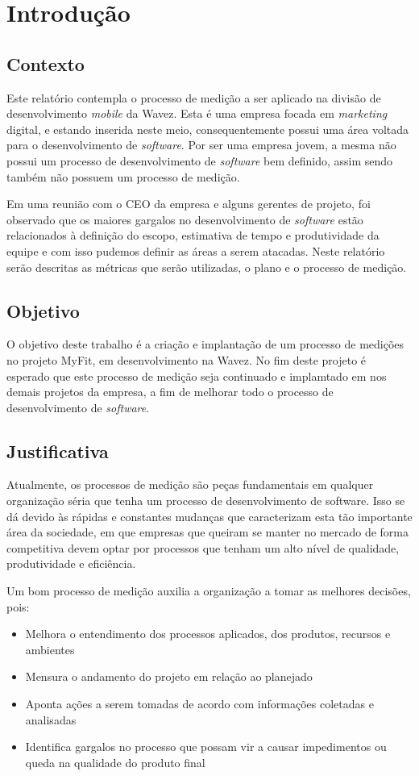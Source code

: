 \chapter{Introdução}
\section{Contexto}
Este relatório contempla o processo de medição a ser aplicado na divisão de desenvolvimento \textit{mobile} da Wavez. Esta é uma empresa focada em \textit{marketing} digital, e estando inserida neste meio, consequentemente possui uma área voltada para o desenvolvimento de \textit{software}. Por ser uma empresa jovem, a mesma não possui um processo de desenvolvimento de \textit{software} bem definido, assim sendo também não possuem um processo de medição.

Em uma reunião com o CEO da empresa e alguns gerentes de projeto, foi observado que os maiores gargalos no desenvolvimento de \textit{software} estão relacionados à definição do escopo, estimativa de tempo e produtividade da equipe e com isso pudemos definir as áreas a serem atacadas. Neste relatório serão descritas as métricas que serão utilizadas, o plano e o processo de medição.
\section{Objetivo}
O objetivo deste trabalho é a criação e implantação de um processo de medições no projeto MyFit, em desenvolvimento na Wavez. No fim deste projeto é esperado que este processo de medição seja continuado e implamtado em nos demais projetos da empresa, a fim de melhorar todo o processo de desenvolvimento de \textit{software}.
\section{Justificativa}
Atualmente, os processos de medição são peças fundamentais em qualquer organização séria que tenha um processo de desenvolvimento de software. Isso se dá devido às rápidas e constantes mudanças que caracterizam esta tão importante área da sociedade, em que empresas que queiram se manter no mercado de forma competitiva devem optar por processos que tenham um alto nível de qualidade, produtividade e eficiência.

Um bom processo de medição auxilia a organização a tomar as melhores decisões, pois:
\begin{itemize}
\item Melhora o entendimento dos processos aplicados, dos produtos, recursos e ambientes
\item Mensura o andamento do projeto em relação ao planejado
\item Aponta ações a serem tomadas de acordo com informações coletadas e analisadas
\item Identifica gargalos no processo que possam vir a causar impedimentos ou queda na qualidade do produto final
\end{itemize}
